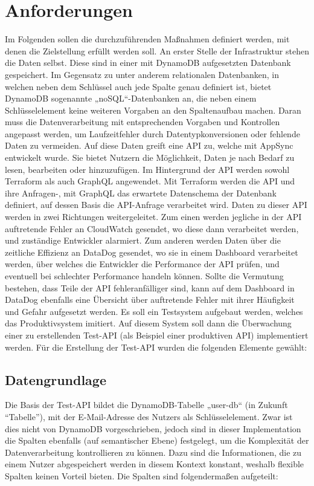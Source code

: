 \section{Anforderungen}
Im Folgenden sollen die durchzuführenden Maßnahmen definiert werden, mit denen die Zielstellung erfüllt werden soll. 
An erster Stelle der Infrastruktur stehen die Daten selbst. Diese sind in einer mit DynamoDB aufgesetzten Datenbank gespeichert. 
Im Gegensatz zu unter anderem relationalen Datenbanken, in welchen neben dem Schlüssel auch jede Spalte genau definiert ist, bietet DynamoDB sogenannte „noSQL“-Datenbanken an, die neben einem Schlüsselelement keine weiteren Vorgaben an den Spaltenaufbau machen. Daran muss die Datenverarbeitung mit entsprechenden Vorgaben und Kontrollen angepasst werden, um Laufzeitfehler durch Datentypkonversionen oder fehlende Daten zu vermeiden.  Auf diese Daten greift eine API zu, welche mit AppSync entwickelt wurde. Sie bietet Nutzern die Möglichkeit, Daten je nach Bedarf zu lesen, bearbeiten oder hinzuzufügen. Im Hintergrund der API werden sowohl Terraform als auch GraphQL angewendet. Mit Terraform werden die API und ihre Anfragen-, mit GraphQL das erwartete Datenschema der Datenbank definiert, auf dessen Basis die API-Anfrage verarbeitet wird. Daten zu dieser API werden in zwei Richtungen weitergeleitet. Zum einen werden jegliche in der API auftretende Fehler an CloudWatch gesendet, wo diese dann verarbeitet werden, und zuständige Entwickler alarmiert. Zum anderen werden Daten über die zeitliche Effizienz an DataDog gesendet, wo sie in einem Dashboard verarbeitet werden, über welches die Entwickler die Performance der API prüfen, und eventuell bei schlechter Performance handeln können. Sollte die Vermutung bestehen, dass Teile der API fehleranfälliger sind, kann auf dem Dashboard in DataDog ebenfalls eine Übersicht über auftretende Fehler mit ihrer Häufigkeit und Gefahr aufgesetzt werden.
Es soll ein Testsystem aufgebaut werden, welches das Produktivsystem imitiert. Auf diesem System soll dann die Überwachung einer zu erstellenden Test-API (als Beispiel einer produktiven API) implementiert werden. Für die Erstellung der Test-API wurden die folgenden Elemente gewählt: 
\subsection{Datengrundlage}
Die Basis der Test-API bildet die DynamoDB-Tabelle „user-db“ (in Zukunft ``Tabelle''), mit der E-Mail-Adresse des Nutzers als Schlüsselelement. Zwar ist dies nicht von DynamoDB vorgeschrieben, jedoch sind in dieser Implementation die Spalten ebenfalls (auf semantischer Ebene) festgelegt, um die Komplexität der Datenverarbeitung kontrollieren zu können.  Dazu sind die Informationen, die zu einem Nutzer abgespeichert werden in diesem Kontext konstant, weshalb flexible Spalten keinen Vorteil bieten. \newpage 
Die Spalten sind folgendermaßen aufgeteilt:


